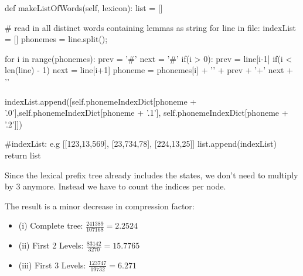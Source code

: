 \begin{python}
def makeListOfWords(self, lexicon):
	list = []

	# read in all distinct words containing lemmas as string
	for line in file:
		indexList = []
		phonemes = line.split();

		for i in range(phonemes):
			prev = '#'
			next = '#'
			if(i > 0):
				prev = line[i-1]
			if(i < len(line) - 1)
				next = line[i+1]
			phoneme = phonemes[i] + '{' + prev + '+' next + '}'

			indexList.append([self.phonemeIndexDict[phoneme + '.0'],self.phonemeIndexDict[phoneme + '.1'],
			self.phonemeIndexDict[phoneme + '.2']])

		#indexList: e.g [[123,13,569], [23,734,78], [224,13,25]]
		list.append(indexList)
	return list
\end{python}

Since the lexical prefix tree already includes the states, we don't need to multiply by 3 anymore. Instead we have to count the indices per node.

The result is a minor decrease in compression factor: 

\begin{itemize}
	\item (i) Complete tree: $\frac{241389}{107168} = 2.2524$
	\item (ii) First 2 Levels: $\frac{83142}{3270} = 15.7765$
	\item (iii) First 3 Levels: $\frac{123747}{19732} = 6.271$
\end{itemize}

